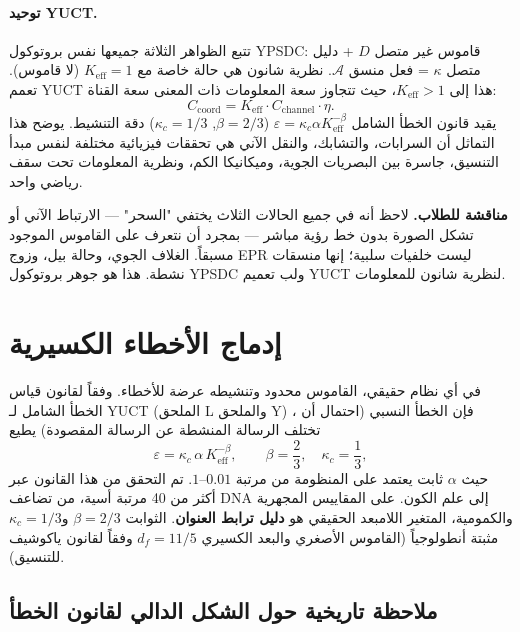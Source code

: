 \documentclass[12pt,a4paper]{article}
\theoremstyle{remark}
\begin{document}
	\paragraph{توحيد YUCT.}
	تتبع الظواهر الثلاثة جميعها نفس بروتوكول YPSDC: قاموس غير متصل \(D\) + دليل متصل \(\kappa\) = فعل منسق \(\mathcal{A}\). نظرية شانون هي حالة خاصة مع \(K_{\mathrm{eff}}=1\) (لا قاموس). تعمم YUCT هذا إلى \(K_{\mathrm{eff}}>1\)، حيث تتجاوز سعة المعلومات ذات المعنى سعة القناة:
	\[
	C_{\mathrm{coord}} = K_{\mathrm{eff}} \cdot C_{\mathrm{channel}} \cdot \eta.
	\]
	يقيد قانون الخطأ الشامل \(\varepsilon = \kappa_c \alpha K_{\mathrm{eff}}^{-\beta}\) (\(\beta=2/3\), \(\kappa_c=1/3\)) دقة التنشيط. يوضح هذا التماثل أن السرابات، والتشابك، والنقل الآني هي تحققات فيزيائية مختلفة لنفس مبدأ التنسيق، جاسرة بين البصريات الجوية، وميكانيكا الكم، ونظرية المعلومات تحت سقف رياضي واحد.
	
	\vspace{0.2cm}
	\noindent\textbf{مناقشة للطلاب.} 
	لاحظ أنه في جميع الحالات الثلاث يختفي "السحر" — الارتباط الآني أو تشكل الصورة بدون خط رؤية مباشر — بمجرد أن نتعرف على القاموس الموجود مسبقاً. الغلاف الجوي، وحالة بيل، وزوج EPR ليست خلفيات سلبية؛ إنها منسقات نشطة. هذا هو جوهر بروتوكول YPSDC ولب تعميم YUCT لنظرية شانون للمعلومات.
	
	\section{إدماج الأخطاء الكسيرية}
	\label{sec:errors}
	
	في أي نظام حقيقي، القاموس محدود وتنشيطه عرضة للأخطاء. وفقاً لقانون قياس الخطأ الشامل لـ YUCT (الملحق L والملحق Y) \cite{AppendixL, AppendixY}، فإن الخطأ النسبي (احتمال أن تختلف الرسالة المنشطة عن الرسالة المقصودة) يطيع
	\begin{equation}
		\boxed{\varepsilon = \kappa_c \, \alpha \, K_{\mathrm{eff}}^{-\beta}}, \qquad 
		\beta = \frac{2}{3},\quad \kappa_c = \frac{1}{3},
		\label{eq:error-law-corrected}
	\end{equation}
	حيث \(\alpha\) ثابت يعتمد على المنظومة من مرتبة \(0.01\)–\(1\). تم التحقق من هذا القانون عبر أكثر من 40 مرتبة أسية، من تضاعف DNA إلى علم الكون. على المقاييس المجهرية والكمومية، المتغير اللامبعد الحقيقي هو \textbf{دليل ترابط العنوان}. الثوابت \(\beta = 2/3\) و\(\kappa_c = 1/3\) مثبتة أنطولوجياً (القاموس الأصغري والبعد الكسيري \(d_f = 11/5\) وفقاً لقانون ياكوشيف للتنسيق).
	
	\subsection*{ملاحظة تاريخية حول الشكل الدالي لقانون الخطأ}
	
\end{document}
